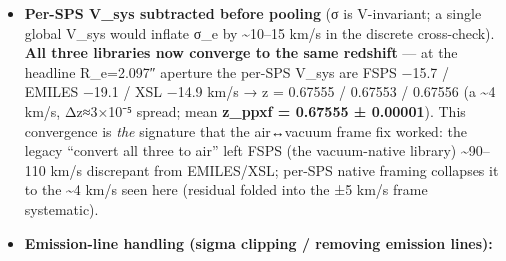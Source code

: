 \documentclass[
]{article}
\begin{document}
\begin{itemize}
  Ciddor 1996, following Cappellari's pattern). Why: the legacy
  ``convert galaxy to air for all three'' produced a spurious −90 km/s
  FSPS V\_sys; the fix collapsed the V\_sys split-track
  \textasciitilde110 → \textasciitilde15--18 km/s (σ shift ≤2 km/s).
  {[}reference\_ppxf\_vacair\_handling.md{]}
\item
  \textbf{Per-SPS V\_sys subtracted before pooling} (σ is V-invariant; a
  single global V\_sys would inflate σ\_e by \textasciitilde10--15 km/s
  in the discrete cross-check). \textbf{All three libraries now converge
  to the same redshift} --- at the headline R\_e=2.097″ aperture the
  per-SPS V\_sys are FSPS −15.7 / EMILES −19.1 / XSL −14.9 km/s → z =
  0.67555 / 0.67553 / 0.67556 (a \textasciitilde4 km/s, Δz≈3×10⁻⁵
  spread; mean \textbf{z\_ppxf = 0.67555 ± 0.00001}). This convergence
  is \emph{the} signature that the air↔vacuum frame fix worked: the
  legacy ``convert all three to air'' left FSPS (the vacuum-native
  library) \textasciitilde90--110 km/s discrepant from EMILES/XSL;
  per-SPS native framing collapses it to the \textasciitilde4 km/s seen
  here (residual folded into the ±5 km/s frame systematic).
\item
  \textbf{Emission-line handling (sigma clipping / removing emission
  lines):}


\end{itemize}
\end{document}
